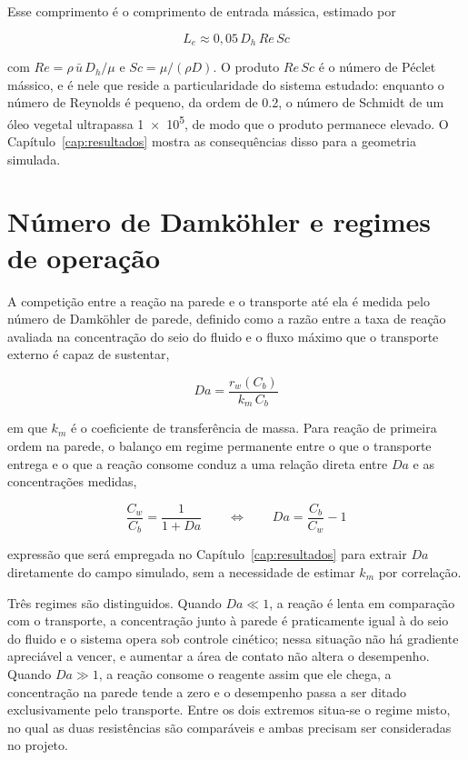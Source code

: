 Esse comprimento é o comprimento de entrada mássica, estimado por

\begin{equation}
L_e \approx 0{,}05\, D_h\, Re\, Sc
\label{eq:entrada}
\end{equation}

\noindent
com $Re = \rho\,\bar{u}\,D_h/\mu$ e $Sc = \mu/(\rho D)$. O produto $Re\,Sc$ é o
número de Péclet mássico, e é nele que reside a particularidade do sistema
estudado: enquanto o número de Reynolds é pequeno, da ordem de \num{0.2}, o
número de Schmidt de um óleo vegetal ultrapassa \num{1e5}, de modo que o produto
permanece elevado. O Capítulo~\ref{cap:resultados} mostra as consequências
disso para a geometria simulada.

\section{Número de Damköhler e regimes de operação}
\label{sec:damkohler}

A competição entre a reação na parede e o transporte até ela é medida pelo
número de Damköhler de parede, definido como a razão entre a taxa de reação
avaliada na concentração do seio do fluido e o fluxo máximo que o transporte
externo é capaz de sustentar,

\begin{equation}
Da = \frac{r_w(C_b)}{k_m\,C_b}
\label{eq:damkohler}
\end{equation}

\noindent
em que $k_m$ é o coeficiente de transferência de massa. Para reação de primeira
ordem na parede, o balanço em regime permanente entre o que o transporte entrega
e o que a reação consome conduz a uma relação direta entre $Da$ e as
concentrações medidas,

\begin{equation}
\frac{C_w}{C_b} = \frac{1}{1 + Da}
\qquad \Longleftrightarrow \qquad
Da = \frac{C_b}{C_w} - 1
\label{eq:cwcb}
\end{equation}

\noindent
expressão que será empregada no Capítulo~\ref{cap:resultados} para extrair $Da$
diretamente do campo simulado, sem a necessidade de estimar $k_m$ por correlação.

Três regimes são distinguidos. Quando $Da \ll 1$, a reação é lenta em comparação
com o transporte, a concentração junto à parede é praticamente igual à do seio
do fluido e o sistema opera sob controle cinético; nessa situação não há
gradiente apreciável a vencer, e aumentar a área de contato não altera o
desempenho. Quando $Da \gg 1$, a reação consome o reagente assim que ele chega,
a concentração na parede tende a zero e o desempenho passa a ser ditado
exclusivamente pelo transporte. Entre os dois extremos situa-se o regime misto,
no qual as duas resistências são comparáveis e ambas precisam ser consideradas
no projeto.

